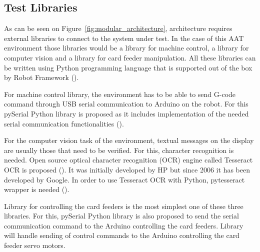\FloatBarrier
\subsection{Test Libraries}
\label{subsection:test libraries}

As can be seen on Figure~\ref{fig:modular_architecture}, architecture requires external libraries to connect to the system under test. In the case of this AAT environment those libraries would be a library for machine control, a library for computer vision and a library for card feeder manipulation. All these libraries can be written using Python programming language that is supported out of the box by Robot Framework (\emph{\cite{robotframework}}).

For machine control library, the environment has to be able to send G-code command through USB serial communication to Arduino on the robot. For this pySerial Python library is proposed as it includes implementation of the needed serial communication functionalities (\emph{\cite{pyserial}}).

For the computer vision task of the environment, textual messages on the display are usually those that need to be verified. For this, character recognition is needed. Open source optical character recognition (OCR) engine called Tesseract OCR is proposed (\emph{\cite{tesseract}}). It was initially developed by HP but since 2006 it has been developed by Google. In order to use Tesseract OCR with Python, pytesseract wrapper is needed (\emph{\cite{pytesseract}}).

Library for controlling the card feeders is the most simplest one of these three libraries. For this, pySerial Python library is also proposed to send the serial communication command to the Arduino controlling the card feeders. Library will handle sending of control commands to the Arduino controlling the card feeder servo motors.